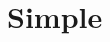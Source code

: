 \documentclass{article}
\begin{document}
\section{Simple}


\begin{stack}
\end{stack}
\end{document}
